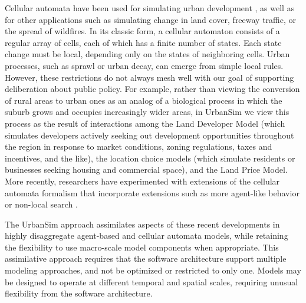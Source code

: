 Cellular automata have been used for simulating urban development
\citep{batty-envplanning-1998,batty-computers-environment-1999,clark-envplanning-1997},
as well as for other applications such as simulating change in
land cover, freeway traffic, or the spread of wildfires.  In its
classic form, a cellular automaton consists of a regular array of
cells, each of which has a finite number of states.  Each state
change must be local, depending only on the states of neighboring
cells.  Urban processes, such as sprawl or urban decay, can emerge
from simple local rules.  However, these restrictions do not
always mesh well with our goal of supporting deliberation about
public policy.  For example, rather than viewing the conversion of
rural areas to urban ones as an analog of a biological process in
which the suburb grows and occupies increasingly wider areas, in
UrbanSim we view this process as the result of interactions among
the Land Developer Model (which simulates developers actively
seeking out development opportunities throughout the region in
response to market conditions, zoning regulations, taxes and
incentives, and the like), the location choice models (which
simulate residents or businesses seeking housing and commercial
space), and the Land Price Model.  More recently, researchers have
experimented with extensions of the cellular automata formalism
that incorporate extensions such as more agent-like behavior or
non-local search \citep{batty-jiang-1999,osullivan-2000}.

The UrbanSim approach assimilates aspects of these recent
developments in highly disaggregate agent-based and cellular
automata models, while retaining the flexibility to use
macro-scale model components when appropriate.  This
assimilative approach requires that the software architecture
support multiple modeling approaches, and not be optimized or
restricted to only one.  Models may be designed to operate at
different temporal and spatial scales, requiring unusual
flexibility from the software architecture. 

